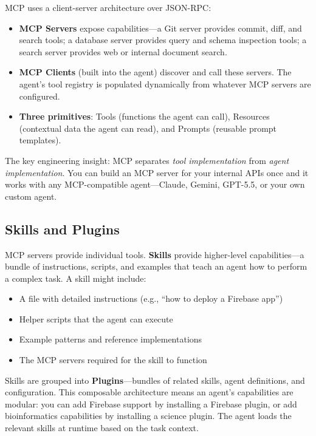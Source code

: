 MCP uses a client-server architecture over JSON-RPC:

\begin{itemize}[leftmargin=*]
    \item \textbf{MCP Servers} expose capabilities---a Git server provides commit, diff, and search tools; a database server provides query and schema inspection tools; a search server provides web or internal document search.
    \item \textbf{MCP Clients} (built into the agent) discover and call these servers. The agent's tool registry is populated dynamically from whatever MCP servers are configured.
    \item \textbf{Three primitives}: Tools (functions the agent can call), Resources (contextual data the agent can read), and Prompts (reusable prompt templates).
\end{itemize}

The key engineering insight: MCP separates \emph{tool implementation} from \emph{agent implementation}. You can build an MCP server for your internal APIs once and it works with any MCP-compatible agent---Claude, Gemini, GPT-5.5, or your own custom agent.

\subsection{Skills and Plugins}

MCP servers provide individual tools. \textbf{Skills} provide higher-level capabilities---a bundle of instructions, scripts, and examples that teach an agent how to perform a complex task. A skill might include:

\begin{itemize}[leftmargin=*]
    \item A  file with detailed instructions (e.g., ``how to deploy a Firebase app'')
    \item Helper scripts that the agent can execute
    \item Example patterns and reference implementations
    \item The MCP servers required for the skill to function
\end{itemize}

Skills are grouped into \textbf{Plugins}---bundles of related skills, agent definitions, and configuration. This composable architecture means an agent's capabilities are modular: you can add Firebase support by installing a Firebase plugin, or add bioinformatics capabilities by installing a science plugin. The agent loads the relevant skills at runtime based on the task context.

